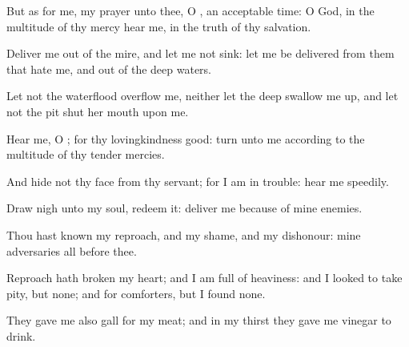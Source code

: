 {\Q {}But as for me, my
prayer
{} unto thee, O
{},
{} an
acceptable
time: O
God, in the
multitude of thy
mercy
hear me, in the
truth of thy
salvation.


\par }{\Q {}Deliver me out of the
mire, and let me not
sink: let me be
delivered from them that
hate me, and out of the
deep
waters.


\par }{\Q {}Let not the
waterflood
overflow me, neither let the
deep swallow me
up, and let not the
pit
shut her
mouth upon me.


\par }{\Q {}Hear me, O
{}; for thy
lovingkindness
{}
good:
turn unto me according to the
multitude of thy tender
mercies.


\par }{\Q {}And
hide not thy
face from thy
servant; for I am in
trouble:
hear me
speedily.


\par }{\Q {}Draw
nigh unto my
soul,
{}
redeem it:
deliver me because of mine
enemies.


\par }{\Q {}Thou hast
known my
reproach, and my
shame, and my
dishonour: mine
adversaries
{} all before thee.


\par }{\Q {}Reproach hath
broken my
heart; and I am full of
heaviness: and I
looked
{} to take
pity, but
{} none; and for
comforters, but I
found none.


\par }{\Q {}They
gave me also
gall for my
meat; and in my
thirst they gave me
vinegar to
drink.


\par }{\BB \par }
